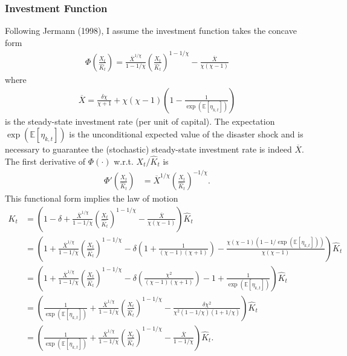 \documentclass[12 pt, oneside]{article}
\theoremstyle{definition}
\theoremstyle{definition}
\theoremstyle{definition}
\newcommand{\E}{\mathbb{E}}
\begin{document}
\subsubsection{Investment Function}
Following Jermann (1998), I assume the investment function takes the concave form
\begin{align}\label{eq:invst fnct}
  \Phi\left(\frac{X_t}{\hat{K}_t}\right) = \frac{\overline{X}^{1/\chi}}{1 - 1/\chi}\left(\frac{X_t}{\hat{K}_t}\right)^{1 - 1/\chi} - \frac{\overline{X}}{\chi(\chi - 1)}
\end{align}
where
\begin{align}\label{eq:steady state invst rate defn}
\overline{X} = \frac{\delta \chi}{\chi + 1} + \chi(\chi - 1)\left(1 - \frac{1}{\exp(\E[\eta_{k, t}])}\right)
\end{align}
is the steady-state investment rate (per unit of capital). The expectation $\exp(\E[\eta_{k, t}])$ is the unconditional expected value of the disaster shock and is necessary to guarantee the (stochastic) steady-state investment rate is indeed $\overline{X}$. The first derivative of $\Phi(\cdot)$ w.r.t. $X_t / \hat{K}_t$ is
\begin{align}\label{eq:invst fnct first deriv}
    \Phi'\left(\frac{X_t}{\hat{K}_t}\right) & = \overline{X}^{1/\chi}\left(\frac{X_t}{ \hat{K}_t}\right)^{-1/\chi}.
\end{align}
This functional form implies the law of motion
\begin{align*}
  K_t & = \left(1 - \delta + \frac{\overline{X}^{1/\chi}}{1 - 1/\chi}\left(\frac{X_t}{\hat{K}_t}\right)^{1 - 1/\chi} - \frac{\overline{X}}{\chi(\chi - 1)}\right)\hat{K}_t\\
      & = \left(1 + \frac{\overline{X}^{1/\chi}}{1 - 1/\chi}\left(\frac{X_t}{\hat{K}_t}\right)^{1 - 1/\chi} -\delta \left(1 +  \frac{1}{(\chi - 1)(\chi + 1)}\right) - \frac{\chi(\chi - 1)(1 - 1 / \exp(\E[\eta_{k, t}]))}{\chi(\chi - 1)}\right)\hat{K}_t\\
      & = \left(1 + \frac{\overline{X}^{1/\chi}}{1 - 1/\chi}\left(\frac{X_t}{\hat{K}_t}\right)^{1 - 1/\chi} -\delta \left(\frac{\chi^2}{(\chi - 1)(\chi + 1)}\right) - 1 + \frac{1}{\exp(\E[\eta_{k, t}])} \right)\hat{K}_t\\
      & = \left(\frac{1}{\exp(\E[\eta_{k, t}])} + \frac{\overline{X}^{1/\chi}}{1 - 1/\chi}\left(\frac{X_t}{\hat{K}_t}\right)^{1 - 1/\chi} -\frac{\delta\chi^2}{\chi^2(1 - 1 / \chi)(1 + 1 / \chi)}\right)\hat{K}_t\\
      & = \left(\frac{1}{\exp(\E[\eta_{k, t}])} + \frac{\overline{X}^{1/\chi}}{1 - 1/\chi}\left(\frac{X_t}{\hat{K}_t}\right)^{1 - 1/\chi} -\frac{\overline{X}}{1 - 1 / \chi}\right)\hat{K}_t.
\end{align*}
\end{document}
